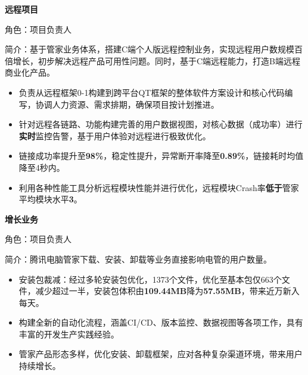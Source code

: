 \documentclass{resume}
\begin{document}
{\textbf{\large{远程项目}}}
\vspace{0.5ex}
\par{角色：项目负责人}
\vspace{0.3ex}
\par{简介：基于管家业务体系，搭建C端个人版远程控制业务，实现远程用户数规模百倍增长，初步解决远程产品可用性问题。同时，基于C端远程能力，打造B端远程商业化产品。}
\begin{itemize}[itemsep=0.4em]
  \item 负责从远程框架0-1构建到跨平台QT框架的整体软件方案设计和核心代码编写，协调人力资源、需求排期，确保项目按计划推进。
  \item 针对远程各链路、功能构建完善的用户数据视图，对核心数据（成功率）进行\textbf{实时}监控告警，基于用户体验对远程进行极致优化。
  \item 链接成功率提升至\textbf{98\%}，稳定性提升，异常断开率降至\textbf{0.89\%}，链接耗时均值降至4秒内。
  \item 利用各种性能工具分析远程模块性能并进行优化，远程模块Crash率\textbf{低于}管家平均模块水平\textbf{3\textperthousand}。
\end{itemize}

\vspace{1.0ex}
{\textbf{\large{增长业务}}}
\vspace{0.3ex}
\par{角色：项目负责人}
\vspace{0.5ex}
\par{简介：腾讯电脑管家下载、安装、卸载等业务直接影响电管的用户数量。}
\begin{itemize}[itemsep=0.4em]
  \item 安装包裁减：经过多轮安装包优化，1373个文件，优化至基本包仅663个文件，减少超过一半，安装包体积由\textbf{109.44MB}降为\textbf{57.55MB}，带来近万新入每天。
  \item 构建全新的自动化流程，涵盖CI/CD、版本监控、数据视图等各项工作，具有丰富的开发生产实践经验。
  \item 管家产品形态多样，优化安装、卸载框架，应对各种复杂渠道环境，带来用户持续增长。
\end{itemize}

\end{document}
